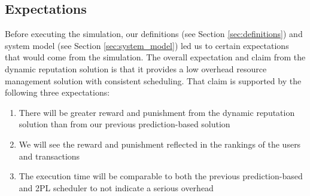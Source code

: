 \subsection{Expectations}
\label{sec:anal_expectations}

Before executing the simulation, our definitions (see Section \ref{sec:definitions}) and system model (see Section \ref{sec:system_model}) led us to certain expectations that would come from the simulation. The overall expectation and claim from the dynamic reputation solution is that it provides a low overhead resource management solution with consistent scheduling. That claim is supported by the following three expectations:

\begin{enumerate}
    \item There will be greater reward and punishment from the dynamic reputation solution than from our previous prediction-based solution
    \item We will see the reward and punishment reflected in the rankings of the users and transactions
    \item The execution time will be comparable to both the previous prediction-based and \ac{2PL} scheduler to not indicate a serious overhead
\end{enumerate}